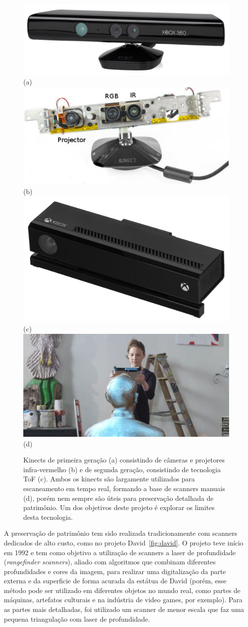 \begin{figure} [!h]
	\centering
	\includegraphics[width=0.45\linewidth]{figs/Xbox-360-Kinect-Standalone.png}(a)
	\includegraphics[width=0.45\linewidth]{figs/kinect-internals.pdf}(b)
 	\includegraphics[width=0.45\linewidth]{figs/Xbox-One-Kinect.jpg}(c)
 	\includegraphics[width=0.45\linewidth]{figs/kinect-handheld1.png} (d)
	\caption{%
   Kinects de primeira geração (a) consistindo de câmeras e projetores
   infra-vermelho (b) e de segunda geração, consistindo de tecnologia ToF (c). 
   Ambos os kinects são largamente utilizados para escaneamento em tempo real, 
   formando a base de scanners manuais (d), porém nem sempre são úteis para 
   preservação detalhada de patrimônio. Um dos objetivos deste
   projeto é explorar os limites desta tecnologia.
	}\label{fig:kinect}
\end{figure}

A preservação de patrimônio tem sido realizada tradicionamente com scanners
dedicados de alto custo, como no projeto David~\ref{fig:david}.
O projeto teve início em 1992 e tem como objetivo a utilização de scanners a laser de profundidade
({\it rangefinder scanners}), aliado com algoritmos que combinam diferentes profundidades e cores da imagem, 
para realizar uma digitalização da parte externa e da superficie de forma acurada da estátua de David 
(porém, esse método pode ser utilizado em diferentes objetos no mundo real, 
como partes de máquinas, artefatos culturais e na indústria de video games, por exemplo). 
Para as partes mais detalhadas, foi utilizado um scanner de menor escala que faz uma pequena 
triangulação com laser de profundidade.

